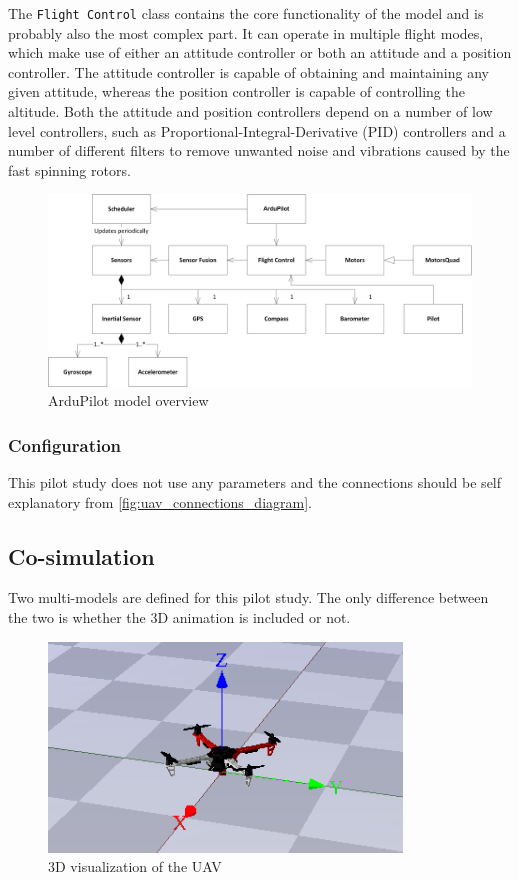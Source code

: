 \begin{description}
				The \texttt{Flight Control} class contains the core functionality of the model and is probably also the most complex part.
				It can operate in multiple flight modes, which make use of either an attitude controller or both an attitude and a position controller.
				The attitude controller is capable of obtaining and maintaining any given attitude, whereas the position controller is capable of controlling the altitude.
				Both the attitude and position controllers depend on a number of low level controllers, such as Proportional-Integral-Derivative (PID) controllers and a number of different filters to remove unwanted noise and vibrations caused by the fast spinning rotors.
				\begin{figure}[htbp]
					\centering
					\includegraphics[width=\linewidth]{uavsingle/detailed_de_model.png}
					\caption{ArduPilot model overview}
					\label{fig:uav_ardupilot_overview}
				\end{figure}

		\end{description}
		
	\subsubsection{Configuration}
		This pilot study does not use any parameters and the connections should be self explanatory from \autoref{fig:uav_connections_diagram}.

	\subsection{Co-simulation}
	\label{sec:uavsingle_into_co}
		Two multi-models are defined for this pilot study.
		The only difference between the two is whether the 3D animation is included or not.

		\begin{figure}[htbp]
			\centering
			\includegraphics[width=0.5\linewidth]{uavsingle/drone_animation_cropped.png}
			\caption{3D visualization of the UAV}
			\label{fig:uav_3d_animation}
		\end{figure}
